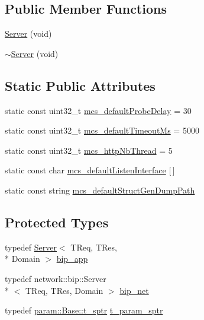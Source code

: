 \subsection*{Public Member Functions}
\begin{DoxyCompactItemize}
\item 
\hyperlink{classxtd_1_1servers_1_1app_1_1Server_ac30046979fc32ad42c2436c0f3854ea2}{Server} (void)
\item 
\hyperlink{classxtd_1_1servers_1_1app_1_1Server_a1b30c4e9066d130569acb7d31c125e20}{$\sim$\-Server} (void)
\end{DoxyCompactItemize}
\subsection*{Static Public Attributes}
\begin{DoxyCompactItemize}
\item 
static const uint32\-\_\-t \hyperlink{classxtd_1_1servers_1_1app_1_1Server_ae361d389bf6050e2565055e7e3800e82}{mcs\-\_\-default\-Probe\-Delay} = 30
\item 
static const uint32\-\_\-t \hyperlink{classxtd_1_1servers_1_1app_1_1Server_a76f9b8224a5555f638527752e26d5457}{mcs\-\_\-default\-Timeout\-Ms} = 5000
\item 
static const uint32\-\_\-t \hyperlink{classxtd_1_1servers_1_1app_1_1Server_ac9944d61cb7fd45d86c1128e1ac55670}{mcs\-\_\-http\-Nb\-Thread} = 5
\item 
static const char \hyperlink{classxtd_1_1servers_1_1app_1_1Server_a9d3ac8218bf47d8ffa6d8b30a6195fa8}{mcs\-\_\-default\-Listen\-Interface} \mbox{[}$\,$\mbox{]}
\item 
static const string \hyperlink{classxtd_1_1servers_1_1app_1_1Server_afae8d71c231f3e48ec8270217fddae10}{mcs\-\_\-default\-Struct\-Gen\-Dump\-Path}
\end{DoxyCompactItemize}
\subsection*{Protected Types}
\begin{DoxyCompactItemize}
\item 
typedef \hyperlink{classxtd_1_1servers_1_1app_1_1Server}{Server}$<$ T\-Req, T\-Res, \\*
Domain $>$ \hyperlink{classxtd_1_1servers_1_1app_1_1Server_a6159422bbffe0fd3d02eb21c4e61011e}{bip\-\_\-app}
\item 
typedef network\-::bip\-::\-Server\\*
$<$ T\-Req, T\-Res, Domain $>$ \hyperlink{classxtd_1_1servers_1_1app_1_1Server_a7254e9a899be59bbe8ea13ca127108dc}{bip\-\_\-net}
\item 
typedef \hyperlink{classxtd_1_1servers_1_1param_1_1Base_aaf4d92eca642f61cb81524096926c6a1}{param\-::\-Base\-::t\-\_\-sptr} \hyperlink{classxtd_1_1servers_1_1app_1_1Server_a72a3c0bea3f2fc2e87b98e09e54fc9ac}{t\-\_\-param\-\_\-sptr}
\end{DoxyCompactItemize}

